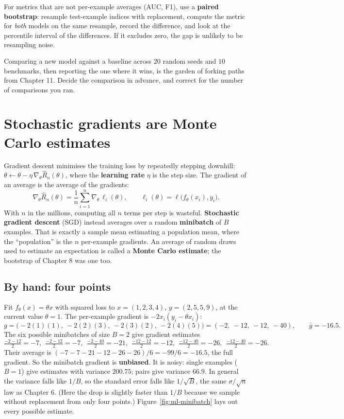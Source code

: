 For metrics that are not per-example averages (AUC, F1), use a \textbf{paired bootstrap}:
resample test-example indices with replacement, compute the metric for \emph{both} models on
the same resample, record the difference, and look at the percentile interval of the
differences. If it excludes zero, the gap is unlikely to be resampling noise.

\begin{trapbox}
Comparing a new model against a baseline across $20$ random seeds and $10$ benchmarks, then
reporting the one where it wins, is the garden of forking paths from Chapter 11. Decide the
comparison in advance, and correct for the number of comparisons you ran.
\end{trapbox}

\section{Stochastic gradients are Monte Carlo estimates}
\label{sec:ml-sgd}

Gradient descent minimises the training loss by repeatedly stepping downhill:
$\theta \leftarrow \theta - \eta\,\nabla_\theta \hat R_n(\theta)$, where the \textbf{learning
rate} $\eta$ is the step size. The gradient of an average is the average of the gradients:
\[
\nabla_\theta \hat R_n(\theta) = \frac1n\sum_{i=1}^n \nabla_\theta\,\ell_i(\theta),
\qquad \ell_i(\theta) = \ell\big(f_\theta(x_i),y_i\big).
\]
With $n$ in the millions, computing all $n$ terms per step is wasteful. \textbf{Stochastic
gradient descent} (SGD) instead averages over a random \textbf{minibatch} of $B$ examples. That
is exactly a sample mean estimating a population mean, where the ``population'' is the $n$
per-example gradients. An average of random draws used to estimate an expectation is called a
\textbf{Monte Carlo estimate}; the bootstrap of Chapter 8 was one too.

\subsection{By hand: four points}

Fit $f_\theta(x)=\theta x$ with squared loss to $x=(1,2,3,4)$, $y=(2,5,5,9)$, at the current
value $\theta=1$. The per-example gradient is $-2x_i(y_i-\theta x_i)$:
\[
g = \big(-2(1)(1),\ -2(2)(3),\ -2(3)(2),\ -2(4)(5)\big) = (-2,\ -12,\ -12,\ -40),
\qquad \bar g = -16.5 .
\]
The six possible minibatches of size $B=2$ give gradient estimates
\[
\tfrac{-2-12}{2}=-7,\ \ \tfrac{-2-12}{2}=-7,\ \ \tfrac{-2-40}{2}=-21,\ \
\tfrac{-12-12}{2}=-12,\ \ \tfrac{-12-40}{2}=-26,\ \ \tfrac{-12-40}{2}=-26.
\]
Their average is $(-7-7-21-12-26-26)/6 = -99/6 = -16.5$, the full gradient. So the minibatch
gradient is \textbf{unbiased}. It is noisy: single examples ($B=1$) give estimates with
variance $200.75$; pairs give variance $66.9$. In general the variance falls like $1/B$, so the
standard error falls like $1/\sqrt B$, the same $\sigma/\sqrt n$ law as Chapter 6. (Here the
drop is slightly faster than $1/B$ because we sample without replacement from only four points.)
Figure~\ref{fig:ml-minibatch} lays out every possible estimate.

